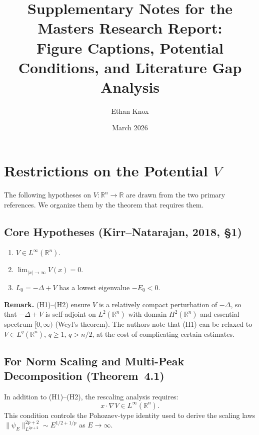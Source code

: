 \documentclass[11pt]{article}
\title{Supplementary Notes for the Masters Research Report:\\
Figure Captions, Potential Conditions, and Literature Gap Analysis}
\author{Ethan Knox}
\date{March 2026}
\begin{document}
\maketitle


\section{Restrictions on the Potential $V$}

The following hypotheses on $V:\mathbb{R}^n\to\mathbb{R}$ are drawn from the two primary references.
We organize them by the theorem that requires them.

\subsection{Core Hypotheses (Kirr--Natarajan, 2018, \S1)}

\begin{enumerate}[label=\textbf{(H\arabic*)}]
  \item $V\in L^\infty(\mathbb{R}^n)$.
  \item $\displaystyle\lim_{|x|\to\infty} V(x) = 0$.
  \item $L_0 = -\Delta + V$ has a lowest eigenvalue $-E_0 < 0$.
\end{enumerate}

\noindent\textbf{Remark.}
(H1)--(H2) ensure $V$ is a relatively compact perturbation of $-\Delta$, so that $-\Delta+V$ is self-adjoint on $L^2(\mathbb{R}^n)$ with domain $H^2(\mathbb{R}^n)$ and essential spectrum $[0,\infty)$ (Weyl's theorem). The authors note that (H1) can be relaxed to $V\in L^q(\mathbb{R}^n)$, $q\geq 1$, $q > n/2$, at the cost of complicating certain estimates.

\subsection{For Norm Scaling and Multi-Peak Decomposition (Theorem~4.1)}

In addition to (H1)--(H2), the rescaling analysis requires:
\begin{equation}
  \boxed{x\cdot\nabla V \in L^\infty(\mathbb{R}^n).} \tag{H4$'$}
\end{equation}
This condition controls the Pohozaev-type identity used to derive the scaling laws $\|\psi_E\|_{L^{2p+2}}^{2p+2} \sim E^{1/2+1/p}$ as $E\to\infty$.
\end{document}

